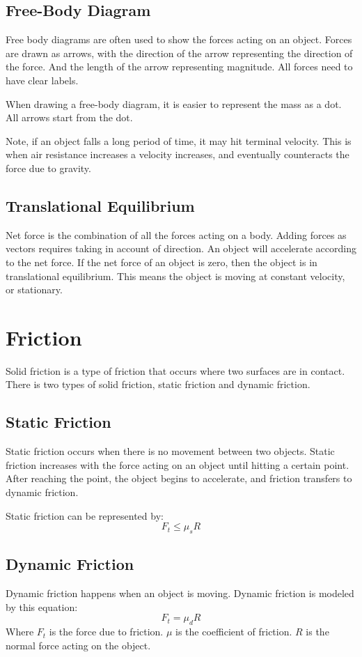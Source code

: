 \documentclass[../notes.tex]{subfiles}
\begin{document}
\subsection{Free-Body Diagram}
Free body diagrams are often used to show the forces acting on an object.
Forces are drawn as arrows, with the direction of the arrow representing the direction of the force.
And the length of the arrow representing magnitude.
All forces need to have clear labels.

When drawing a free-body diagram, it is easier to represent the mass as a dot.
All arrows start from the dot.

Note, if an object falls a long period of time, it may hit terminal velocity.
This is when air resistance increases a velocity increases, and eventually counteracts the force due to gravity.

\subsection{Translational Equilibrium}
Net force is the combination of all the forces acting on a body.
Adding forces as vectors requires taking in account of direction.
An object will accelerate according to the net force.
If the net force of an object is zero, then the object is in translational equilibrium.
This means the object is moving at constant velocity, or stationary.

\section{Friction}
Solid friction is a type of friction that occurs where two surfaces are in contact.
There is two types of solid friction, static friction and dynamic friction.

\subsection{Static Friction}
Static friction occurs when there is no movement between two objects.
Static friction increases with the force acting on an object until hitting a certain point.
After reaching the point, the object begins to accelerate, and friction transfers to dynamic friction.

Static friction can be represented by:
\begin{equation}
	F_t \le \mu_s R
\end{equation}

\subsection{Dynamic Friction}
Dynamic friction happens when an object is moving.
Dynamic friction is modeled by this equation:
\begin{equation}
	F_t = {\mu}_d R
\end{equation}
Where $F_t$ is the force due to friction. 
$\mu$ is the coefficient of friction.
$R$ is the normal force acting on the object.
\end{document}
